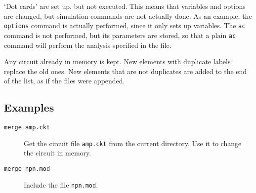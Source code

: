 `Dot cards' are set up, but not executed.  This means that variables and
options are changed, but simulation commands are not actually done.  As
an example, the {\tt options} command is actually performed, since it only
sets up variables.  The {\tt ac} command is not performed, but its parameters
are stored, so that a plain {\tt ac} command will perform the analysis
specified in the file.

Any circuit already in memory is kept.  New elements with duplicate labels
replace the old ones.  New elements that are not duplicates are added to the
end of the list, as if the files were appended.
\subsection{Examples}

\begin{description}

\item[{\tt merge amp.ckt}] Get the circuit file {\tt amp.ckt} from
the current directory.  Use it to change the circuit in memory.

\item[{\tt merge npn.mod}] Include the file {\tt npn.mod}.

\end{description}
